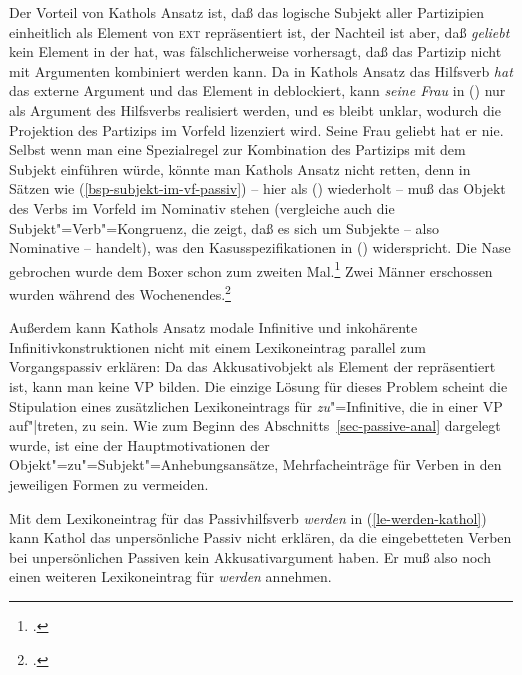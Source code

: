 {Der Vorteil von Kathols Ansatz ist, daß das logische Subjekt
aller Partizipien einheitlich als Element von \textsc{ext} repräsentiert ist,
der Nachteil ist aber, daß \emph{geliebt} kein Element in der \subcatl hat,
was fälschlicherweise vorhersagt, daß das Partizip nicht mit Argumenten kombiniert
werden kann. Da in Kathols Ansatz das Hilfsverb \emph{hat} das externe Argument und das
Element in \subj deblockiert, kann \emph{seine Frau} in () nur als Argument des Hilfsverbs
realisiert werden, und es bleibt unklar, wodurch die Projektion des Partizips im Vorfeld
lizenziert wird.
\ea
Seine Frau geliebt hat er nie.
\z
Selbst wenn man eine Spezialregel zur Kombination des Partizips mit dem Subjekt einführen würde,
könnte man Kathols Ansatz nicht retten, denn in Sätzen wie (\ref{bsp-subjekt-im-vf-passiv}) -- hier als
() wiederholt -- muß das Objekt
des Verbs im Vorfeld im Nominativ stehen (vergleiche auch die Subjekt"=Verb"=Kongruenz, die zeigt,
daß es sich um Subjekte -- also Nominative -- handelt), was den Kasusspezifikationen in () widerspricht.
\eal
\label{bsp-subjekt-im-vf-passiv-zwei}
\ex{}
Die Nase gebrochen wurde dem Boxer schon zum zweiten Mal.\footnote{
        .
}
\ex{}
Zwei Männer erschossen wurden    während des Wochenendes.\footnote{
        .%
        }
\label{bsp-subjekt-im-vf-passiv-letzt-zwei}
\zl

\noindent
Außerdem kann Kathols Ansatz modale Infinitive 
und inkohärente Infinitivkonstruktionen nicht mit einem Lexikoneintrag parallel zum Vorgangspassiv
erklären:
Da das Akkusativobjekt als Element der \subjl repräsentiert ist, kann man keine VP
bilden. Die einzige Lösung für dieses Problem scheint die Stipulation eines zusätzlichen
Lexikoneintrags für \emph{zu}"=Infinitive, die in einer VP auf"|treten, zu sein.
Wie zum Beginn des Abschnitts~\ref{sec-passive-anal} dargelegt wurde, ist eine der Hauptmotivationen
der Objekt"=zu"=Subjekt"=Anhebungsansätze, Mehrfacheinträge für Verben in den jeweiligen
Formen zu vermeiden.

Mit dem Lexikoneintrag für das Passivhilfsverb \emph{werden} in (\ref{le-werden-kathol}) 
kann Kathol das unpersönliche Passiv nicht erklären, da die eingebetteten Verben bei unpersönlichen Passiven kein
Akkusativargument haben. Er muß also noch einen weiteren Lexikoneintrag für \emph{werden}
annehmen.

}
